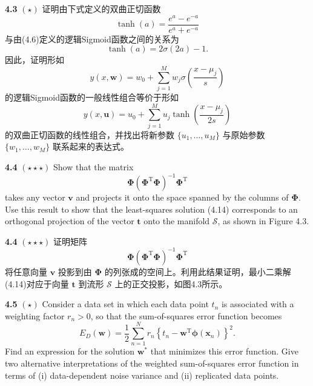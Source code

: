 \documentclass{article}
\begin{document}
\textbf{4.3} $(\star)$ 证明由下式定义的双曲正切函数
\begin{equation}
\tanh(a) = \frac{e^a - e^{-a}}{e^a + e^{-a}} \tag{4.55}
\end{equation}
与由(4.6)定义的逻辑Sigmoid函数之间的关系为
\begin{equation}
\tanh(a) = 2\sigma(2a) - 1. \tag{4.56}
\end{equation}
因此，证明形如
\begin{equation}
y(x, \mathbf{w}) = w_0 + \sum_{j=1}^{M} w_j \sigma \left( \frac{x - \mu_j}{s} \right) \tag{4.57}
\end{equation}
的逻辑Sigmoid函数的一般线性组合等价于形如
\begin{equation}
y(x, \mathbf{u}) = u_0 + \sum_{j=1}^{M} u_j \tanh \left( \frac{x - \mu_j}{2s} \right) \tag{4.58}
\end{equation}
的双曲正切函数的线性组合，并找出将新参数 $\{u_1, \dots, u_M\}$ 与原始参数 $\{w_1, \dots, w_M\}$ 联系起来的表达式。


\textbf{4.4} $(\star\star\star)$ Show that the matrix
\begin{equation}
\boldsymbol{\Phi}(\boldsymbol{\Phi}^{\mathrm{T}}\boldsymbol{\Phi})^{-1}\boldsymbol{\Phi}^{\mathrm{T}} \tag{4.59}
\end{equation}
takes any vector $\mathbf{v}$ and projects it onto the space spanned by the columns of $\boldsymbol{\Phi}$. Use this result to show that the least-squares solution (4.14) corresponds to an orthogonal projection of the vector $\mathbf{t}$ onto the manifold $\mathcal{S}$, as shown in Figure 4.3.

\textbf{4.4} $(\star\star\star)$ 证明矩阵
\begin{equation}
\boldsymbol{\Phi}(\boldsymbol{\Phi}^{\mathrm{T}}\boldsymbol{\Phi})^{-1}\boldsymbol{\Phi}^{\mathrm{T}} \tag{4.59}
\end{equation}
将任意向量 $\mathbf{v}$ 投影到由 $\boldsymbol{\Phi}$ 的列张成的空间上。利用此结果证明，最小二乘解(4.14)对应于向量 $\mathbf{t}$ 到流形 $\mathcal{S}$ 上的正交投影，如图4.3所示。


\textbf{4.5} $(\star)$ Consider a data set in which each data point $t_n$ is associated with a weighting factor $r_n > 0$, so that the sum-of-squares error function becomes
\begin{equation}
E_D(\mathbf{w}) = \frac{1}{2} \sum_{n=1}^{N} r_n \left\{ t_n - \mathbf{w}^{\mathrm{T}} \boldsymbol{\phi}(\mathbf{x}_n) \right\}^2. \tag{4.60}
\end{equation}
Find an expression for the solution $\mathbf{w}^*$ that minimizes this error function. Give two alternative interpretations of the weighted sum-of-squares error function in terms of (i) data-dependent noise variance and (ii) replicated data points.
\end{document}
